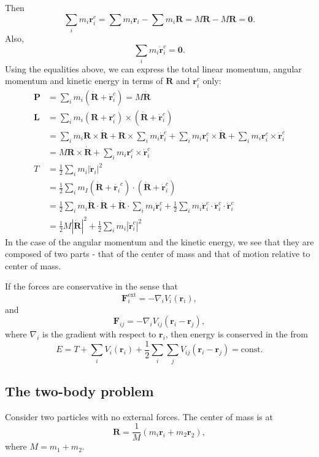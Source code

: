 \documentclass[a4paper]{article}
\begin{document}
Then
\[
  \sum_i m_i\mathbf{r}_i^c = \sum m_i \mathbf{r}_i - \sum m_i \mathbf{R} = M\mathbf{R} - M\mathbf{R} = \mathbf{0}.
\]
Also,
\[
  \sum_i m_i \dot{\mathbf{r}}_i^c = \mathbf{0}.
\]
Using the equalities above, we can express the total linear momentum, angular momentum and kinetic energy in terms of $\mathbf{R}$ and $\mathbf{r}_i^c$ only:
\begin{align*}
  \mathbf{P} &= \sum_i m_i(\dot{\mathbf{R}} + \dot{\mathbf{r}}_i^c) = M\dot{\mathbf{R}}\\
  \mathbf{L} &= \sum_i m_i(\mathbf{R} + \mathbf{r}_i^c) \times (\dot{\mathbf{R}} + \dot{\mathbf{r}}_i^c)\\
  &= \sum_i m_i \mathbf{R}\times \dot{\mathbf{R}} + \mathbf{R}\times \sum_i m_i \dot{\mathbf{r}}_i^c + \sum_i m_i \mathbf{r}_i^c\times \dot{\mathbf{R}} + \sum_i m_i \mathbf{r}_i^c \times \dot{\mathbf{r}}_i^c\\
  &= M\mathbf{R}\times \dot{\mathbf{R}} + \sum_i m_i \mathbf{r}_i^c \times \dot{\mathbf{r}}_i^c\\
  T&= \frac{1}{2}\sum_i m_i|\dot{\mathbf{r}}_i|^2\\
  &= \frac{1}{2}\sum_i m_I (\dot{\mathbf{R}} + \dot{\mathbf{r}_i}^c)\cdot (\dot{\mathbf{R}} + \dot{\mathbf{r}}_i^c)\\
  &= \frac{1}{2}\sum_i m_i \dot{\mathbf{R}}\cdot \dot{\mathbf{R}} + \dot{\mathbf{R}} \cdot \sum_i m_i \dot{\mathbf{r}}_i^c + \frac{1}{2}\sum_i m_i \dot{\mathbf{r}}_i^c\cdot \dot{\mathbf{r}}_i^c\cdot \dot{\mathbf{r}}_i^c\\
  &=\frac{1}{2}M|\dot{\mathbf{R}}|^2 + \frac{1}{2}\sum_i m_i|\dot{\mathbf{r}}_i^c|^2
\end{align*}
In the case of the angular momentum and the kinetic energy, we see that they are composed of two parts - that of the center of mass and that of motion relative to center of mass.

If the forces are conservative in the sense that
\[
  \mathbf{F}_i^{\text{ext}} = -\nabla_i V_i(\mathbf{r}_i),
\]
and
\[
  \mathbf{F}_{ij} = -\nabla_i V_{ij} (\mathbf{r}_i - \mathbf{r}_j),
\]
where $\nabla_i$ is the gradient with respect to $\mathbf{r}_i$, then energy is conserved in the from
\[
  E = T + \sum_i V_i(\mathbf{r}_i) + \frac{1}{2}\sum_i\sum_j V_{ij}(\mathbf{r}_i - \mathbf{r}_j) = \text{const.}
\]
\subsection{The two-body problem}
Consider two particles with no external forces. The center of mass is at
\[
  \mathbf{R} = \frac{1}{M} (m_i \mathbf{r}_i + m_2 \mathbf{r}_2),
\]
where $M = m_1 + m_2$.
\end{document}
